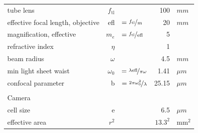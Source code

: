 \documentclass[12pt]{spieman}  %
\begin{document}
\begin{landscape}
\begin{table}[t!]
\begin{tabular}{lrlrl}
		tube lens 																	& $f_{\text{tl}}$	&																																					& 100			&	$mm$		\\
		effective focal length, objective						& efl							& $=\nicefrac{f_{\text{tl}}}{m}$																					& 20			& $mm$		\\
		magnification, effective										& $m_e$						&	$=\nicefrac{f_{\text{tl}}}{\text{efl}}$																	& 5				&					\\
		refractive index														&	$\eta$					&																																					& 1				& 				\\
		beam radius																	& $\omega$				&																																					& 4.5			& $mm$		\\
		min light sheet waist												& $\omega_0$			& $=\nicefrac{\lambda \text{efl}}{\pi \omega}$														& 1.41		& $\mu m$	\\
		confocal parameter													& b								& $=\nicefrac{2 \pi \omega_0^2}{\lambda}$																	& 25.15		& $\mu m$	\\\\
		\multicolumn{5}{l}{Camera}\\\hline\hline
		cell size																		& e								&																																					& 6.5			&	$\mu m$	\\
		effective area 															& $r^2$						&																																					& $13.3^2$	&	$\text{mm}^2$	\\
		\end{tabular}
\end{table}
\end{landscape}		
		


\end{document}
